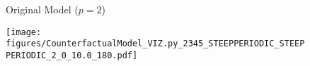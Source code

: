 \documentclass[si.tex]{subfiles}
\begin{document}
\begin{figure}


\begin{comment}

python3 Run_2AFC_Synthetic_FreePrior_CosineLoss_OnSim_RUNALL.py
python3 Run_2AFC_Synthetic_FreePrior_CosineLoss_OnSim_CleanRef_RUNALL.py

python3 Run_2AFC_Synthetic_FreePrior_CosineLoss_OnSim_VIZ.py 2 0 10.0 180 Simulate_2AFC_Synthetic_Parameterized_OtherNoiseLevels_Grid_VarySize_WithKL.py_180_2_T5_S80.0_2345_40000_STEEPPERIODIC_STEEPPERIODIC.txt
python3 Run_2AFC_Synthetic_FreePrior_CosineLoss_OnSim_CleanRef_VIZ.py 2 0 10.0 180 Simulate_2AFC_Synthetic_Parameterized_OtherNoiseLevels_Grid_VarySize_WithKL_CleanRef.py_180_2_T9_S80.0_2345_40000_STEEPPERIODIC_STEEPPERIODIC.txt
#python3 Run_2AFC_Synthetic_FreePrior_CosineLoss_OnSim_VIZ.py 8 0 10.0 180 Simulate_2AFC_Synthetic_Parameterized_OtherNoiseLevels_Grid_VarySize_WithKL.py_180_8_T5_S80.0_2345_40000_STEEPPERIODIC_STEEPPERIODIC.txt
#python3 Run_2AFC_Synthetic_FreePrior_CosineLoss_OnSim_CleanRef_VIZ.py 8 0 10.0 180 Simulate_2AFC_Synthetic_Parameterized_OtherNoiseLevels_Grid_VarySize_WithKL_CleanRef.py_180_8_T9_S80.0_2345_40000_STEEPPERIODIC_STEEPPERIODIC.txt


python3 evaluateCrossValidationResults_Synthetic_Gardelle_2AFC.py  Simulate_2AFC_Synthetic_Parameterized_OtherNoiseLevels_Grid_VarySize_WithKL.py_180_2_T5_S80.0_2345_40000_STEEPPERIODIC_STEEPPERIODIC.txt
python3 evaluateCrossValidationResults_Synthetic_Gardelle_2AFC_CleanRef.py  Simulate_2AFC_Synthetic_Parameterized_OtherNoiseLevels_Grid_VarySize_WithKL_CleanRef.py_180_2_T9_S80.0_2345_40000_STEEPPERIODIC_STEEPPERIODIC.txt
#python3 evaluateCrossValidationResults_Synthetic_Gardelle_2AFC.py  Simulate_2AFC_Synthetic_Parameterized_OtherNoiseLevels_Grid_VarySize_WithKL.py_180_8_T5_S80.0_2345_40000_STEEPPERIODIC_STEEPPERIODIC.txt
#python3 evaluateCrossValidationResults_Synthetic_Gardelle_2AFC_CleanRef.py  Simulate_2AFC_Synthetic_Parameterized_OtherNoiseLevels_Grid_VarySize_WithKL_CleanRef.py_180_8_T9_S80.0_2345_40000_STEEPPERIODIC_STEEPPERIODIC.txt

\end{comment}



\centering

Original Model ($p=2$)

\texttt{[image: figures/CounterfactualModel\_VIZ.py\_2345\_STEEPPERIODIC\_STEEPPERIODIC\_2\_0\_10.0\_180.pdf]}


\end{figure}
\end{document}

